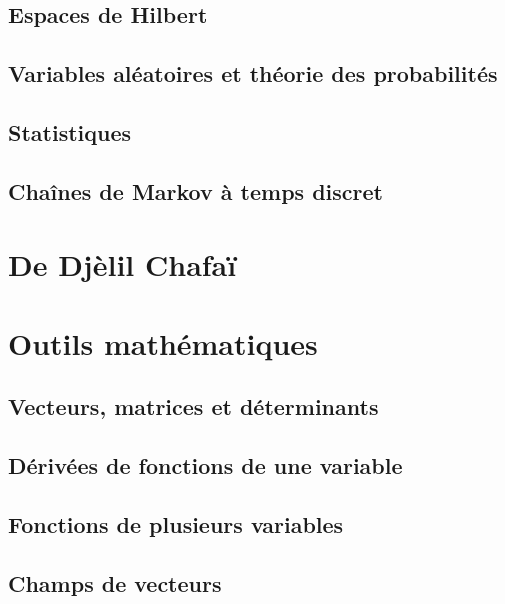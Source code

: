 \chapter{Espaces de Hilbert}



\chapter{Variables aléatoires et théorie des probabilités}



\chapter{Statistiques}


\chapter{Chaînes de Markov à temps discret}


\part{De Djèlil Chafaï}


\part{Outils mathématiques}

\chapter{Vecteurs, matrices et déterminants}

\chapter{Dérivées de fonctions de une variable}


\chapter{Fonctions de plusieurs variables}


\chapter{Champs de vecteurs}


